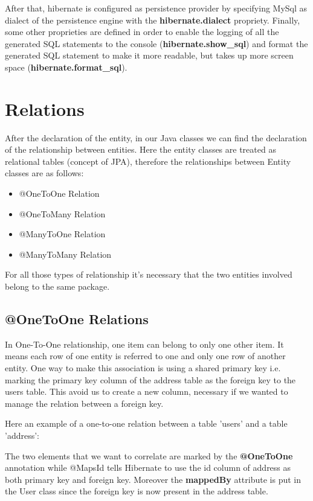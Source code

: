 \documentclass[a4paper]{article}
\begin{document}
After that, hibernate is configured as persistence provider by specifying MySql as dialect of the persistence engine with the \textbf{hibernate.dialect} propriety. Finally, some other proprieties are defined in order to enable the logging of all the generated SQL statements to the console (\textbf{hibernate.show\_sql}) and format the generated SQL statement to make it more readable, but takes up more screen space (\textbf{hibernate.format\_sql}).

\section{Relations}
After the declaration of the entity, in our Java classes we can find the declaration of the relationship between entities. Here the entity classes are treated as relational tables (concept of JPA), therefore the relationships between Entity classes are as follows:

\begin{itemize}
\item{@OneToOne Relation}
\item{@OneToMany Relation}
\item{@ManyToOne Relation}
\item{@ManyToMany Relation}
\end{itemize}
For all those types of relationship it's necessary that the two entities involved belong to the same package.

\subsection{@OneToOne Relations}
In One-To-One relationship, one item can belong to only one other item. It means each row of one entity is referred to one and only one row of another entity.
One way to make this association is using a shared primary key i.e. marking the primary key column of the address table as the foreign key to the users table. This avoid us to create a new column, necessary if we wanted to manage the relation between a foreign key.

Here an example of a one-to-one relation between a table 'users' and a table 'address':


The two elements that we want to correlate are marked by the \textbf{@OneToOne} annotation while @MapsId tells Hibernate to use the id column of address as both primary key and foreign key. Moreover the \textbf{mappedBy} attribute is put in the User class since the foreign key is now present in the address table.
\end{document}
